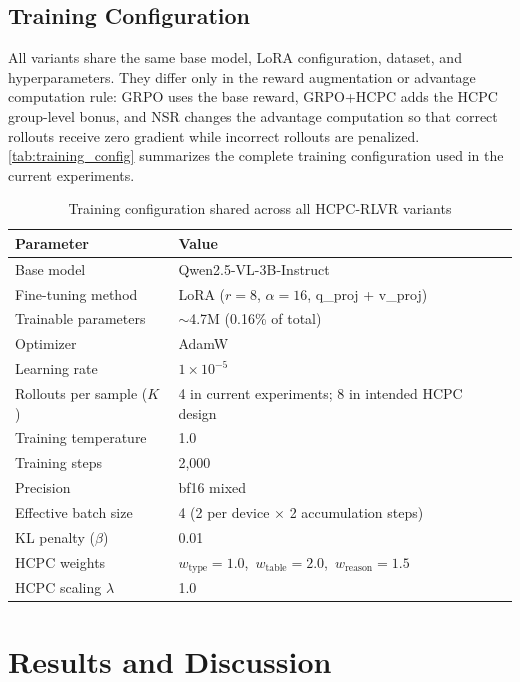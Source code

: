 \documentclass{iutbscthesis}
\begin{document}
\section{Training Configuration}

All variants share the same base model, LoRA configuration, dataset, and hyperparameters. They differ only in the reward augmentation or advantage computation rule: GRPO uses the base reward, GRPO+HCPC adds the HCPC group-level bonus, and NSR changes the advantage computation so that correct rollouts receive zero gradient while incorrect rollouts are penalized. \autoref{tab:training_config} summarizes the complete training configuration used in the current experiments.

\begin{table}[H]
    \centering
    \begin{tabular}{ll}
        \toprule
        Parameter & Value \\
        \midrule
        Base model & Qwen2.5-VL-3B-Instruct \\
        Fine-tuning method & LoRA ($r=8$, $\alpha=16$, q\_proj + v\_proj) \\
        Trainable parameters & $\sim$4.7M (0.16\% of total) \\
        Optimizer & AdamW \\
        Learning rate & $1 \times 10^{-5}$ \\
        Rollouts per sample ($K$) & 4 in current experiments; 8 in intended HCPC design \\
        Training temperature & 1.0 \\
        Training steps & 2,000 \\
        Precision & bf16 mixed \\
        Effective batch size & 4 (2 per device $\times$ 2 accumulation steps) \\
        KL penalty ($\beta$) & 0.01 \\
        HCPC weights & $w_{\text{type}}=1.0$,\ $w_{\text{table}}=2.0$,\ $w_{\text{reason}}=1.5$ \\
        HCPC scaling $\lambda$ & 1.0 \\
        \bottomrule
    \end{tabular}
    \caption{Training configuration shared across all HCPC-RLVR variants}
    \label{tab:training_config}
\end{table}


\chapter{Results and Discussion} \label{chapter:results}
\end{document}
